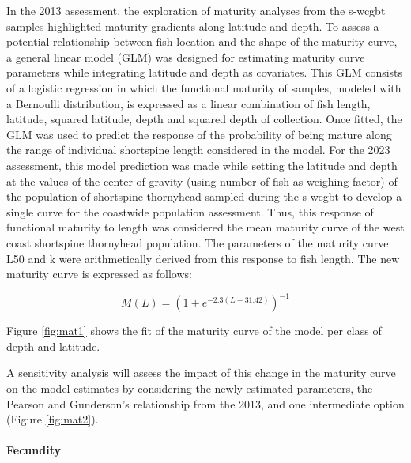 \documentclass[11pt,
  english,
  letterpaper,
]{article}
\begin{document}
In the 2013 assessment, the exploration of maturity analyses from the \gls{s-wcgbt} samples highlighted maturity gradients along latitude and depth. To assess a potential relationship between fish location and the shape of the maturity curve, a general linear model (GLM) was designed for estimating maturity curve parameters while integrating latitude and depth as covariates. This GLM consists of a logistic regression in which the functional maturity of samples, modeled with a Bernoulli distribution, is expressed as a linear combination of fish length, latitude, squared latitude, depth and squared depth of collection. Once fitted, the GLM was used to predict the response of the probability of being mature along the range of individual shortspine length considered in the model. For the 2023 assessment, this model prediction was made while setting the latitude and depth at the values of the center of gravity (using number of fish as weighing factor) of the population of shortspine thornyhead sampled during the \gls{s-wcgbt} to develop a single curve for the coastwide population assessment. Thus, this response of functional maturity to length was considered the mean maturity curve of the west coast shortspine thornyhead population. The parameters of the maturity curve L50 and k were arithmetically derived from this response to fish length. The new maturity curve is expressed as follows:

\begin{equation} M(L) = (1+e^{-2.3(L-31.42)})^{-1}\end{equation}

Figure \ref{fig:mat1} shows the fit of the maturity curve of the model per class of depth and latitude.

A sensitivity analysis will assess the impact of this change in the maturity curve on the model estimates by considering the newly estimated parameters, the Pearson and Gunderson's relationship from the 2013, and one intermediate option (Figure \ref{fig:mat2}).

\hypertarget{fecundity}{%
\paragraph{Fecundity}\label{fecundity}}
\end{document}
